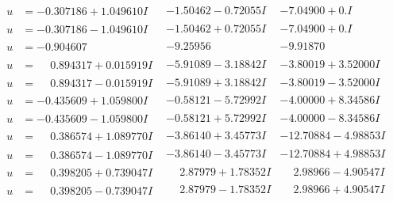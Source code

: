 \documentclass[1p]{elsarticle_modified}
\theoremstyle{definition}
\begin{document}
$$\begin{array}{c|c|c}
\begin{aligned}
u &= -0.307186 + 1.049610 I\end{aligned}
 & -1.50462 - 0.72055 I & -7.04900 + 0. I\phantom{ +0.000000I} \\ \hline\begin{aligned}
u &= -0.307186 - 1.049610 I\end{aligned}
 & -1.50462 + 0.72055 I & -7.04900 + 0. I\phantom{ +0.000000I} \\ \hline\begin{aligned}
u &= -0.904607\phantom{ +0.000000I}\end{aligned}
 & -9.25956\phantom{ +0.000000I} & -9.91870\phantom{ +0.000000I} \\ \hline\begin{aligned}
u &= \phantom{-}0.894317 + 0.015919 I\end{aligned}
 & -5.91089 - 3.18842 I & -3.80019 + 3.52000 I \\ \hline\begin{aligned}
u &= \phantom{-}0.894317 - 0.015919 I\end{aligned}
 & -5.91089 + 3.18842 I & -3.80019 - 3.52000 I \\ \hline\begin{aligned}
u &= -0.435609 + 1.059800 I\end{aligned}
 & -0.58121 - 5.72992 I & -4.00000 + 8.34586 I \\ \hline\begin{aligned}
u &= -0.435609 - 1.059800 I\end{aligned}
 & -0.58121 + 5.72992 I & -4.00000 - 8.34586 I \\ \hline\begin{aligned}
u &= \phantom{-}0.386574 + 1.089770 I\end{aligned}
 & -3.86140 + 3.45773 I & -12.70884 - 4.98853 I \\ \hline\begin{aligned}
u &= \phantom{-}0.386574 - 1.089770 I\end{aligned}
 & -3.86140 - 3.45773 I & -12.70884 + 4.98853 I \\ \hline\begin{aligned}
u &= \phantom{-}0.398205 + 0.739047 I\end{aligned}
 & \phantom{-}2.87979 + 1.78352 I & \phantom{-}2.98966 - 4.90547 I \\ \hline\begin{aligned}
u &= \phantom{-}0.398205 - 0.739047 I\end{aligned}
 & \phantom{-}2.87979 - 1.78352 I & \phantom{-}2.98966 + 4.90547 I \\ \hline\begin{aligned}

\end{aligned}
\end{array}$$
\end{document}
